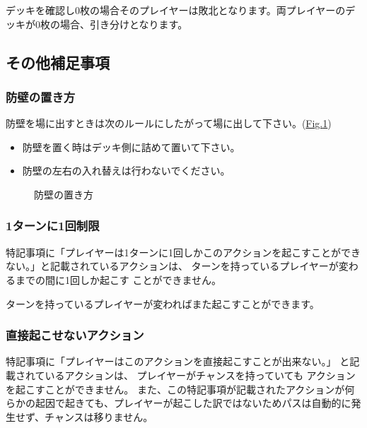 \documentclass[letterpaper,10pt,dvipdfmx]{sphinxmanual}
\begin{document}
\sphinxAtStartPar
デッキを確認し0枚の場合そのプレイヤーは敗北となります。両プレイヤーのデッキが0枚の場合、引き分けとなります。


\subsection{その他補足事項}
\label{\detokenize{common/common:id29}}

\subsubsection{防壁の置き方}
\label{\detokenize{common/common:id30}}
\sphinxAtStartPar
防壁を場に出すときは次のルールにしたがって場に出して下さい。(\hyperref[\detokenize{common/common:set-bulwork}]{Fig.\@ \ref{\detokenize{common/common:set-bulwork}}})
\begin{itemize}
\item {} 
\sphinxAtStartPar
防壁を置く時はデッキ側に詰めて置いて下さい。

\item {} 
\sphinxAtStartPar
防壁の左右の入れ替えは行わないでください。

\end{itemize}

\begin{figure}[htbp]
\centering
\capstart

\noindent{}
\caption{防壁の置き方}\label{\detokenize{common/common:id56}}\label{\detokenize{common/common:set-bulwork}}\end{figure}


\subsubsection{1ターンに1回制限}
\label{\detokenize{common/common:id31}}
\sphinxAtStartPar
特記事項に「プレイヤーは1ターンに1回しかこのアクションを起こすことができない。」と記載されているアクションは、
ターンを持っているプレイヤーが変わるまでの間に1回しか起こす
ことができません。

\sphinxAtStartPar
ターンを持っているプレイヤーが変わればまた起こすことができます。


\subsubsection{直接起こせないアクション}
\label{\detokenize{common/common:id32}}
\sphinxAtStartPar
特記事項に「プレイヤーはこのアクションを直接起こすことが出来ない。」
と記載されているアクションは、
プレイヤーがチャンスを持っていても
アクションを起こすことができません。
また、この特記事項が記載されたアクションが何らかの起因で起きても、プレイヤーが起こした訳ではないためパスは自動的に発生せず、チャンスは移りません。
\end{document}

